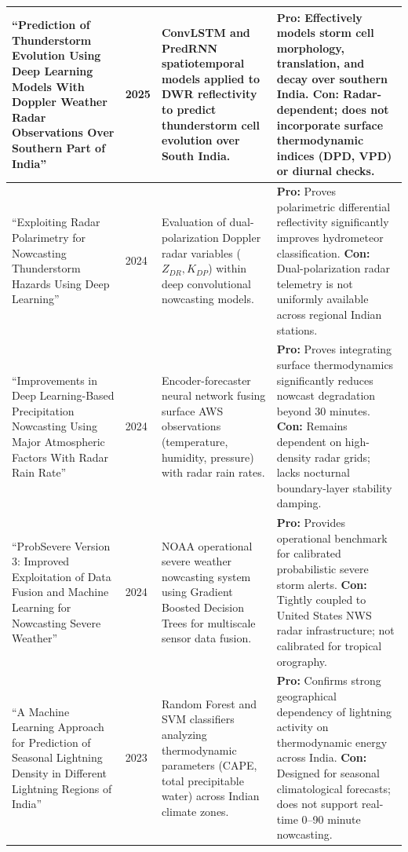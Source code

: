 \documentclass[12pt,a4paper]{report}
\begin{document}
\begin{xltabular}{\textwidth}{|L{3.8cm}|C{1.3cm}|L{4.3cm}|Y|}
``Prediction of Thunderstorm Evolution Using Deep Learning Models With Doppler Weather Radar Observations Over Southern Part of India'' \cite{rayudu2025prediction} & 2025 & ConvLSTM and PredRNN spatiotemporal models applied to DWR reflectivity to predict thunderstorm cell evolution over South India. & \textbf{Pro:} Effectively models storm cell morphology, translation, and decay over southern India. \newline \textbf{Con:} Radar-dependent; does not incorporate surface thermodynamic indices (DPD, VPD) or diurnal checks. \\ \hline
``Exploiting Radar Polarimetry for Nowcasting Thunderstorm Hazards Using Deep Learning'' \cite{rombeek2024exploiting} & 2024 & Evaluation of dual-polarization Doppler radar variables ($Z_{DR}, K_{DP}$) within deep convolutional nowcasting models. & \textbf{Pro:} Proves polarimetric differential reflectivity significantly improves hydrometeor classification. \newline \textbf{Con:} Dual-polarization radar telemetry is not uniformly available across regional Indian stations. \\ \hline
``Improvements in Deep Learning-Based Precipitation Nowcasting Using Major Atmospheric Factors With Radar Rain Rate'' \cite{kim2024improvements} & 2024 & Encoder-forecaster neural network fusing surface AWS observations (temperature, humidity, pressure) with radar rain rates. & \textbf{Pro:} Proves integrating surface thermodynamics significantly reduces nowcast degradation beyond 30 minutes. \newline \textbf{Con:} Remains dependent on high-density radar grids; lacks nocturnal boundary-layer stability damping. \\ \hline
``ProbSevere Version 3: Improved Exploitation of Data Fusion and Machine Learning for Nowcasting Severe Weather'' \cite{cintineo2024probsevere} & 2024 & NOAA operational severe weather nowcasting system using Gradient Boosted Decision Trees for multiscale sensor data fusion. & \textbf{Pro:} Provides operational benchmark for calibrated probabilistic severe storm alerts. \newline \textbf{Con:} Tightly coupled to United States NWS radar infrastructure; not calibrated for tropical orography. \\ \hline
``A Machine Learning Approach for Prediction of Seasonal Lightning Density in Different Lightning Regions of India'' \cite{soni2023machine} & 2023 & Random Forest and SVM classifiers analyzing thermodynamic parameters (CAPE, total precipitable water) across Indian climate zones. & \textbf{Pro:} Confirms strong geographical dependency of lightning activity on thermodynamic energy across India. \newline \textbf{Con:} Designed for seasonal climatological forecasts; does not support real-time 0--90 minute nowcasting. \\ \hline

\end{xltabular}
\end{document}
